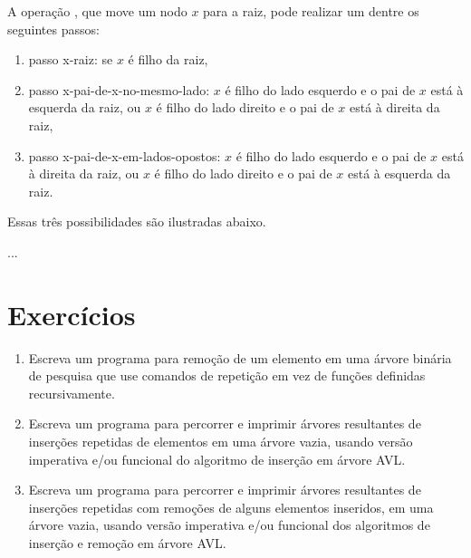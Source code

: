 \begin{enumerate}
  A operação , que move um nodo $x$ para a raiz, pode
  realizar um dentre os seguintes passos:
 
  \begin{enumerate}

    \item passo x-raiz: se $x$ é filho da raiz,

    \item passo x-pai-de-x-no-mesmo-lado: 
          $x$ é filho do lado esquerdo e o pai de $x$ está à esquerda da raiz, ou 
          $x$ é filho do lado direito  e o pai de $x$ está à direita da raiz, 

    \item passo x-pai-de-x-em-lados-opostos: 
          $x$ é filho do lado esquerdo e o pai de $x$ está à direita da raiz, ou 
          $x$ é filho do lado direito  e o pai de $x$ está à esquerda da raiz.

  \end{enumerate}

Essas três possibilidades são ilustradas abaixo.

...

\end{enumerate}

\section{Exercícios}

\begin{enumerate}

\item \label{remocao-de-elemento-em-arvore-binaria-de-pesquisa}
  Escreva um programa para remoção de um elemento em uma árvore
  binária de pesquisa que use comandos de repetição em vez de funções
  definidas recursivamente.

\item \label{experimente-alg-ins-arv-AVL} Escreva um programa para
  percorrer e imprimir árvores resultantes de inserções repetidas de
  elementos em uma árvore vazia, usando versão imperativa e/ou
  funcional do algoritmo de inserção em árvore AVL.

\item \label{experimente-alg-rem-arv-AVL} Escreva um programa para
  percorrer e imprimir árvores resultantes de inserções repetidas com
  remoções de alguns elementos inseridos, em uma árvore vazia, usando
  versão imperativa e/ou funcional dos algoritmos de inserção e
  remoção em árvore AVL.

\end{enumerate}
